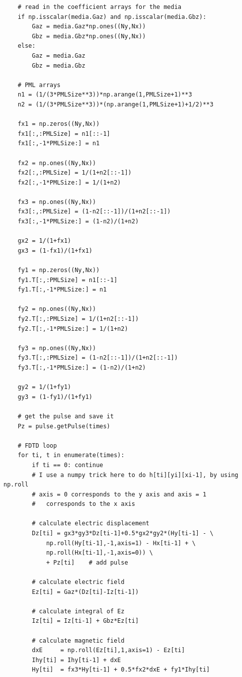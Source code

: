 \documentclass[12pt,twocolumn]{article}
\begin{document}
\begin{verbatim}
    # read in the coefficient arrays for the media
    if np.isscalar(media.Gaz) and np.isscalar(media.Gbz):
        Gaz = media.Gaz*np.ones((Ny,Nx))
        Gbz = media.Gbz*np.ones((Ny,Nx))
    else:
        Gaz = media.Gaz
        Gbz = media.Gbz

    # PML arrays
    n1 = (1/(3*PMLSize**3))*np.arange(1,PMLSize+1)**3
    n2 = (1/(3*PMLSize**3))*(np.arange(1,PMLSize+1)+1/2)**3

    fx1 = np.zeros((Ny,Nx))
    fx1[:,:PMLSize] = n1[::-1]
    fx1[:,-1*PMLSize:] = n1

    fx2 = np.ones((Ny,Nx))
    fx2[:,:PMLSize] = 1/(1+n2[::-1])
    fx2[:,-1*PMLSize:] = 1/(1+n2)

    fx3 = np.ones((Ny,Nx))
    fx3[:,:PMLSize] = (1-n2[::-1])/(1+n2[::-1])
    fx3[:,-1*PMLSize:] = (1-n2)/(1+n2)

    gx2 = 1/(1+fx1)
    gx3 = (1-fx1)/(1+fx1)

    fy1 = np.zeros((Ny,Nx))
    fy1.T[:,:PMLSize] = n1[::-1]
    fy1.T[:,-1*PMLSize:] = n1

    fy2 = np.ones((Ny,Nx))
    fy2.T[:,:PMLSize] = 1/(1+n2[::-1])
    fy2.T[:,-1*PMLSize:] = 1/(1+n2)

    fy3 = np.ones((Ny,Nx))
    fy3.T[:,:PMLSize] = (1-n2[::-1])/(1+n2[::-1])
    fy3.T[:,-1*PMLSize:] = (1-n2)/(1+n2)

    gy2 = 1/(1+fy1)
    gy3 = (1-fy1)/(1+fy1)

    # get the pulse and save it
    Pz = pulse.getPulse(times)

    # FDTD loop
    for ti, t in enumerate(times):
        if ti == 0: continue
        # I use a numpy trick here to do h[ti][yi][xi-1], by using np.roll
        # axis = 0 corresponds to the y axis and axis = 1
        #   corresponds to the x axis

        # calculate electric displacement
        Dz[ti] = gx3*gy3*Dz[ti-1]+0.5*gx2*gy2*(Hy[ti-1] - \
            np.roll(Hy[ti-1],-1,axis=1) - Hx[ti-1] + \
            np.roll(Hx[ti-1],-1,axis=0)) \
            + Pz[ti]    # add pulse

        # calculate electric field
        Ez[ti] = Gaz*(Dz[ti]-Iz[ti-1])

        # calculate integral of Ez
        Iz[ti] = Iz[ti-1] + Gbz*Ez[ti]

        # calculate magnetic field
        dxE     = np.roll(Ez[ti],1,axis=1) - Ez[ti]
        Ihy[ti] = Ihy[ti-1] + dxE
        Hy[ti]  = fx3*Hy[ti-1] + 0.5*fx2*dxE + fy1*Ihy[ti]


\end{verbatim}
\end{document}
